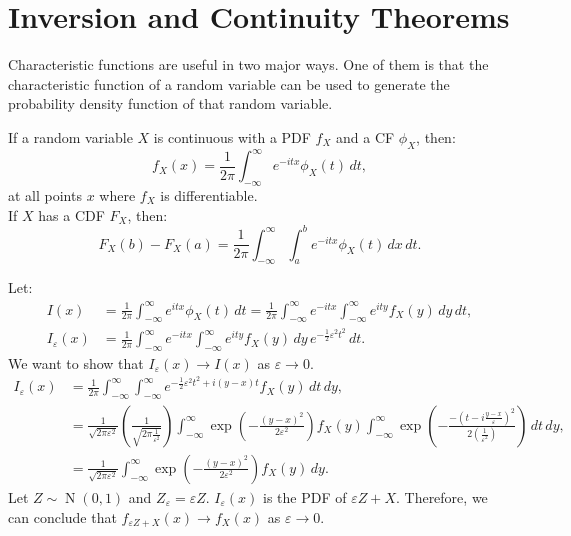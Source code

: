 \documentclass{huhtakm-template-book-v2}
\DeclareMathOperator{\N}{N}
\begin{document}
\section{Inversion and Continuity Theorems}
    Characteristic functions are useful in two major ways. One of them is that the characteristic function of a random variable can be used to generate the probability density function of that random variable.
    \begin{thm}
        If a random variable $X$ is continuous with a PDF $f_{X}$ and a CF $\phi_{X}$, then:
        \begin{equation*}
            f_{X}(x) = \frac{1}{2\pi}\int_{-\infty}^{\infty} e^{-itx}\phi_{X}(t)\,dt,
        \end{equation*}
        at all points $x$ where $f_{X}$ is differentiable.\\
        If $X$ has a CDF $F_{X}$, then:
        \begin{equation*}
            F_{X}(b)-F_{X}(a) = \frac{1}{2\pi}\int_{-\infty}^{\infty}\int_{a}^{b}e^{-itx}\phi_{X}(t)\,dx\,dt.
        \end{equation*}
    \end{thm}
    \begin{proofing}
        Let:
        \begin{align*}
            I(x) &= \frac{1}{2\pi}\int_{-\infty}^{\infty} e^{itx}\phi_{X}(t)\,dt = \frac{1}{2\pi}\int_{-\infty}^{\infty} e^{-itx}\int_{-\infty}^{\infty} e^{ity}f_{X}(y)\,dy\,dt,\\
            I_{\varepsilon}(x) &= \frac{1}{2\pi}\int_{-\infty}^{\infty} e^{-itx}\int_{-\infty}^{\infty} e^{ity}f_{X}(y)\,dy\,e^{-\frac{1}{2}\varepsilon^{2}t^{2}}\,dt.
        \end{align*}
        We want to show that $I_{\varepsilon}(x) \to I(x)$ as $\varepsilon \to 0$.
        \begin{align*}
            I_{\varepsilon}(x) &= \frac{1}{2\pi}\int_{-\infty}^{\infty}\int_{-\infty}^{\infty} e^{-\frac{1}{2}\varepsilon^{2}t^{2}+i(y-x)t}f_{X}(y)\,dt\,dy,\\
            &= \frac{1}{\sqrt{2\pi\varepsilon^{2}}}\left(\frac{1}{\sqrt{2\pi\frac{1}{\varepsilon^{2}}}}\right)\int_{-\infty}^{\infty}\exp\left(-\frac{(y-x)^{2}}{2\varepsilon^{2}}\right)f_{X}(y)\int_{-\infty}^{\infty}\exp\left(-\frac{-\left(t-i\frac{y-x}{\varepsilon}\right)^{2}}{2\left(\frac{1}{\varepsilon^{2}}\right)}\right)\,dt\,dy,\\
            &= \frac{1}{\sqrt{2\pi\varepsilon^{2}}}\int_{-\infty}^{\infty}\exp\left(-\frac{(y-x)^{2}}{2\varepsilon^{2}}\right)f_{X}(y)\,dy.
        \end{align*}
        Let $Z \sim \N(0,1)$ and $Z_{\varepsilon} = \varepsilon Z$. $I_{\varepsilon}(x)$ is the PDF of $\varepsilon Z+X$. Therefore, we can conclude that $f_{\varepsilon Z+X}(x) \to f_{X}(x)$ as $\varepsilon \to 0$.
    \end{proofing}
\end{document}
